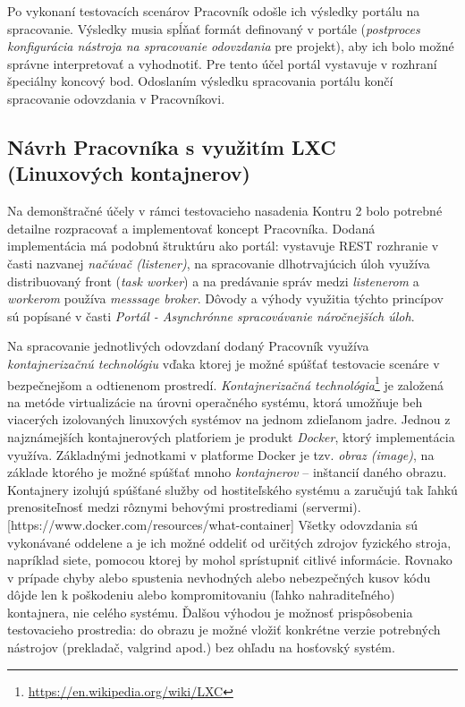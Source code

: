 \documentclass[
  digital, %
  twoside, %
  table,   %
  lof,     %
  lot,     %
]{fithesis3}
\begin{document}
Po vykonaní testovacích scenárov Pracovník odošle ich výsledky portálu na spracovanie. Výsledky musia spĺňať formát definovaný v portále (\emph{postproces konfigurácia nástroja na spracovanie odovzdania} pre projekt), aby ich bolo možné správne interpretovať a vyhodnotiť. Pre tento účel portál vystavuje v rozhraní špeciálny koncový bod. Odoslaním výsledku spracovania portálu končí spracovanie odovzdania v Pracovníkovi.

\subsection{Návrh Pracovníka s využitím LXC (Linuxových kontajnerov)}

Na demonštračné účely v rámci testovacieho nasadenia Kontru 2 bolo potrebné detailne rozpracovať a implementovať koncept Pracovníka. Dodaná implementácia má podobnú štruktúru ako portál: vystavuje REST rozhranie v časti nazvanej \emph{načúvač (listener)}, na spracovanie dlhotrvajúcich úloh využíva distribuovaný front (\emph{task worker}) a na predávanie správ medzi \emph{listenerom} a \emph{workerom} používa \emph{messsage broker}. Dôvody a výhody využitia týchto princípov sú popísané v časti \emph{Portál - Asynchrónne spracovávanie náročnejších úloh}. 

Na spracovanie jednotlivých odovzdaní dodaný Pracovník využíva \emph{kontajnerizačnú technológiu} vďaka ktorej je možné spúšťať testovacie scenáre v bezpečnejšom a odtienenom prostredí. \emph{Kontajnerizačná technológia}\footnote{\url{https://en.wikipedia.org/wiki/LXC}} je založená na metóde virtualizácie na úrovni operačného systému, ktorá umožňuje beh viacerých izolovaných linuxových systémov na jednom zdieľanom jadre. Jednou z najznámejších kontajnerových platforiem je produkt \emph{Docker}, ktorý implementácia využíva. Základnými jednotkami v platforme Docker je tzv. \emph{obraz (image)}, na základe ktorého je možné spúšťať mnoho \emph{kontajnerov} -- inštancií daného obrazu. Kontajnery izolujú spúšťané služby od hostiteľského systému a zaručujú tak ľahkú prenositeľnosť medzi rôznymi behovými prostrediami (servermi).[https://www.docker.com/resources/what-container] Všetky odovzdania sú vykonávané oddelene a je ich možné oddeliť od určitých zdrojov fyzického stroja, napríklad siete, pomocou ktorej by mohol sprístupniť citlivé informácie. Rovnako v prípade chyby alebo spustenia nevhodných alebo nebezpečných kusov kódu dôjde len k poškodeniu alebo kompromitovaniu (ľahko nahraditeľného) kontajnera, nie celého systému. Ďalšou výhodou je možnosť prispôsobenia testovacieho prostredia: do obrazu je možné vložiť konkrétne verzie potrebných nástrojov (prekladač, valgrind apod.) bez ohľadu na hosťovský systém.
\end{document}
